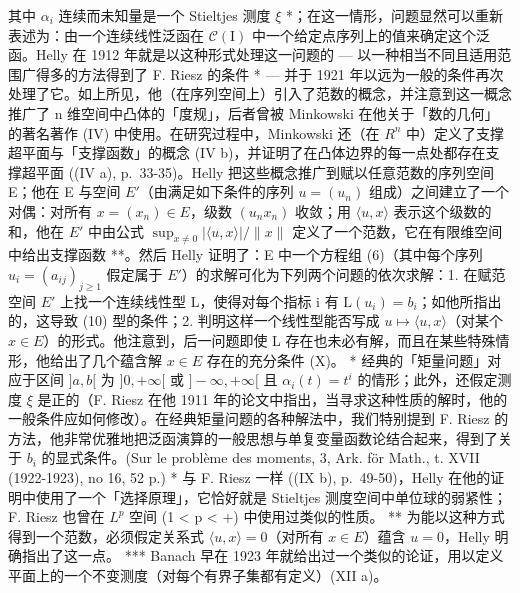 其中 \(\alpha_{i}\) 连续而未知量是一个 Stieltjes 测度 \(\xi\) *；在这一情形，问题显然可以重新表述为：由一个连续线性泛函在 \(\mathcal{C}(\mathrm{I})\) 中一个给定点序列上的值来确定这个泛函。Helly 在 1912 年就是以这种形式处理这一问题的 --- 以一种相当不同且适用范围广得多的方法得到了 F. Riesz 的条件 * --- 并于 1921 年以远为一般的条件再次处理了它。如上所见，他（在序列空间上）引入了范数的概念，并注意到这一概念推广了 n 维空间中凸体的「度规」，后者曾被 Minkowski 在他关于「数的几何」的著名著作 (IV) 中使用。在研究过程中，Minkowski 还（在 \(R^{n}\) 中）定义了支撑超平面与「支撑函数」的概念 (IV b)，并证明了在凸体边界的每一点处都存在支撑超平面 ((IV a), p.~33-35)。Helly 把这些概念推广到赋以任意范数的序列空间 E；他在 E 与空间 \(E'\)（由满足如下条件的序列 \(u = (u_{n})\) 组成）之间建立了一个对偶：对所有 \(x = (x_{n}) \in E\)，级数 \((u_{n}x_{n})\) 收敛；用 \(\langle u, x \rangle\) 表示这个级数的和，他在 \(E'\) 中由公式 \(\sup_{x \neq 0} |\langle u, x \rangle| / \|x\|\) 定义了一个范数，它在有限维空间中给出支撑函数 **。然后 Helly 证明了：E 中一个方程组 (6)（其中每个序列 \(u_{i} = (a_{ij})_{j \geqslant 1}\) 假定属于 \(E'\)）的求解可化为下列两个问题的依次求解：1. 在赋范空间 \(E'\) 上找一个连续线性型 L，使得对每个指标 i 有 \(\mathrm{L}(u_{i}) = b_{i}\)；如他所指出的，这导致 (10) 型的条件；2. 判明这样一个线性型能否写成 \(u \mapsto \langle u, x \rangle\)（对某个 \(x \in E\)）的形式。他注意到，后一问题即使 L 存在也未必有解，而且在某些特殊情形，他给出了几个蕴含解 \(x \in E\) 存在的充分条件 (X)。
* 经典的「矩量问题」对应于区间 \(]a, b[\) 为 \(]0, +\infty[\) 或 \(]-\infty, +\infty[\) 且 \(\alpha_{i}(t) = t^{i}\) 的情形；此外，还假定测度 \(\xi\) 是正的（F. Riesz 在他 1911 年的论文中指出，当寻求这种性质的解时，他的一般条件应如何修改）。在经典矩量问题的各种解法中，我们特别提到 F. Riesz 的方法，他非常优雅地把泛函演算的一般思想与单复变量函数论结合起来，得到了关于 \(b_{i}\) 的显式条件。(Sur le problème des moments, 3, Ark. för Math., t. XVII (1922-1923), no 16, 52 p.)
* 与 F. Riesz 一样 ((IX b), p.~49-50)，Helly 在他的证明中使用了一个「选择原理」，它恰好就是 Stieltjes 测度空间中单位球的弱紧性；F. Riesz 也曾在 \(L^p\) 空间 (1 < p < +\infty) 中使用过类似的性质。
** 为能以这种方式得到一个范数，必须假定关系式 \(\langle u,x\rangle = 0\)（对所有 \(x \in E\)）蕴含 \(u=0\)，Helly 明确指出了这一点。
*** Banach 早在 1923 年就给出过一个类似的论证，用以定义平面上的一个不变测度（对每个有界子集都有定义）(XII a)。


